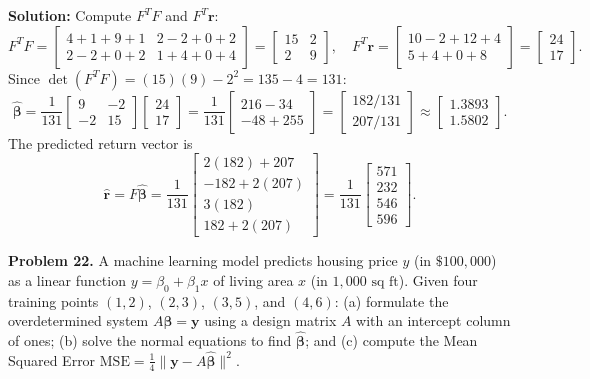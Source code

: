 \documentclass[11pt, letterpaper]{article}
\theoremstyle{definition}
\theoremstyle{remark}
\begin{document}
\textbf{Solution:} Compute $F^T F$ and $F^T \mathbf{r}$:
\[
F^T F = \begin{bmatrix} 4+1+9+1 & 2-2+0+2 \\ 2-2+0+2 & 1+4+0+4 \end{bmatrix} = \begin{bmatrix} 15 & 2 \\ 2 & 9 \end{bmatrix}, \quad F^T \mathbf{r} = \begin{bmatrix} 10-2+12+4 \\ 5+4+0+8 \end{bmatrix} = \begin{bmatrix} 24 \\ 17 \end{bmatrix}.
\]
Since $\det(F^T F) = (15)(9) - 2^2 = 135 - 4 = 131$:
\[
\hat{\boldsymbol{\beta}} = \frac{1}{131} \begin{bmatrix} 9 & -2 \\ -2 & 15 \end{bmatrix} \begin{bmatrix} 24 \\ 17 \end{bmatrix} = \frac{1}{131} \begin{bmatrix} 216 - 34 \\ -48 + 255 \end{bmatrix} = \begin{bmatrix} 182/131 \\ 207/131 \end{bmatrix} \approx \begin{bmatrix} 1.3893 \\ 1.5802 \end{bmatrix}.
\]
The predicted return vector is
\[
\hat{\mathbf{r}} = F\hat{\boldsymbol{\beta}} = \frac{1}{131} \begin{bmatrix} 2(182) + 207 \\ -182 + 2(207) \\ 3(182) \\ 182 + 2(207) \end{bmatrix} = \frac{1}{131} \begin{bmatrix} 571 \\ 232 \\ 546 \\ 596 \end{bmatrix}.
\]

\textbf{Problem 22.} A machine learning model predicts housing price $y$ (in $\$100{,}000$) as a linear function $y = \beta_0 + \beta_1 x$ of living area $x$ (in $1{,}000\text{ sq ft}$). Given four training points $(1, 2)$, $(2, 3)$, $(3, 5)$, and $(4, 6)$: (a) formulate the overdetermined system $A\boldsymbol{\beta} = \mathbf{y}$ using a design matrix $A$ with an intercept column of ones; (b) solve the normal equations to find $\hat{\boldsymbol{\beta}}$; and (c) compute the Mean Squared Error $\text{MSE} = \frac{1}{4}\|\mathbf{y} - A\hat{\boldsymbol{\beta}}\|^2$.
\end{document}
